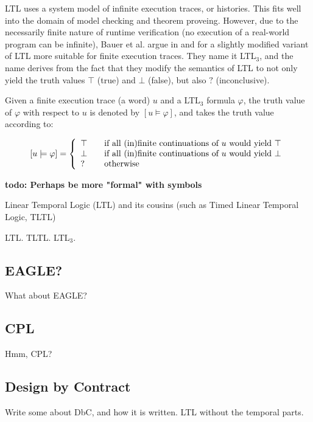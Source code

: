 \documentclass[a4paper,11pt]{kth-mag}
\newcommand{\todo}[1]{\textbf{todo: #1}}
\begin{document}
LTL uses a system model of infinite execution traces, or histories. This fits well into the domain
of model checking and theorem proveing. However, due to the necessarily finite nature of runtime
verification (no execution of a real-world program can be infinite), Bauer et al. argue in
\cite{bauer07rvltl} and \cite{bauer06monitoring} for a slightly modified variant of LTL more suitable
for finite execution traces. They name it LTL$_3$, and the name derives from the fact that they
modify the semantics of LTL to not only yield the truth values $\top$ (true) and $\bot$ (false), but also $?$ (inconclusive).

Given a finite execution trace (a word) $u$ and a LTL$_3$ formula $\varphi$, the truth value of $\varphi$ with respect to $u$ is denoted by $[u \models \varphi]$, and takes the truth value according to:

\[
  [u \models \varphi] = \left\{
  \begin{array}{l l}
    \top & \quad \text{if all (in)finite continuations of $u$ would yield $\top$} \\
    \bot & \quad \text{if all (in)finite continuations of $u$ would yield $\bot$} \\
    ?    & \quad \text{otherwise} \\
  \end{array} \right.
\] 

\todo{Perhaps be more "formal" with symbols}

Linear Temporal Logic (LTL) and its cousins (such as Timed Linear Temporal Logic, TLTL)

LTL. TLTL. LTL$_{3}$.

\subsection{EAGLE?}

What about EAGLE?

\subsection{CPL}

Hmm, CPL?

\subsection{Design by Contract}

Write some about DbC, and how it is written. LTL without the temporal parts.
\end{document}
